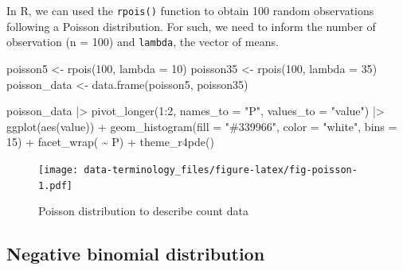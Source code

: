 \documentclass[
  letterpaper,
]{book}
\newenvironment{Shaded}{\begin{snugshade}}{\end{snugshade}}
\newcommand{\AttributeTok}[1]{\textcolor[rgb]{0.40,0.45,0.13}{#1}}
\newcommand{\DecValTok}[1]{\textcolor[rgb]{0.68,0.00,0.00}{#1}}
\newcommand{\FunctionTok}[1]{\textcolor[rgb]{0.28,0.35,0.67}{#1}}
\newcommand{\NormalTok}[1]{\textcolor[rgb]{0.00,0.23,0.31}{#1}}
\newcommand{\OtherTok}[1]{\textcolor[rgb]{0.00,0.23,0.31}{#1}}
\newcommand{\SpecialCharTok}[1]{\textcolor[rgb]{0.37,0.37,0.37}{#1}}
\newcommand{\StringTok}[1]{\textcolor[rgb]{0.13,0.47,0.30}{#1}}
\begin{document}
In R, we can used the \texttt{rpois()} function to obtain 100 random
observations following a Poisson distribution. For such, we need to
inform the number of observation (n = 100) and \texttt{lambda}, the
vector of means.

\begin{Shaded}
\begin{Highlighting}[]
\NormalTok{poisson5 }\OtherTok{\textless{}{-}} \FunctionTok{rpois}\NormalTok{(}\DecValTok{100}\NormalTok{, }\AttributeTok{lambda =} \DecValTok{10}\NormalTok{)}
\NormalTok{poisson35 }\OtherTok{\textless{}{-}} \FunctionTok{rpois}\NormalTok{(}\DecValTok{100}\NormalTok{, }\AttributeTok{lambda =} \DecValTok{35}\NormalTok{)}
\NormalTok{poisson\_data }\OtherTok{\textless{}{-}} \FunctionTok{data.frame}\NormalTok{(poisson5, poisson35)}
\end{Highlighting}
\end{Shaded}

\begin{Shaded}
\begin{Highlighting}[]
\NormalTok{poisson\_data }\SpecialCharTok{|\textgreater{}}
  \FunctionTok{pivot\_longer}\NormalTok{(}\DecValTok{1}\SpecialCharTok{:}\DecValTok{2}\NormalTok{, }\AttributeTok{names\_to =} \StringTok{"P"}\NormalTok{,}
               \AttributeTok{values\_to =} \StringTok{"value"}\NormalTok{) }\SpecialCharTok{|\textgreater{}}
  \FunctionTok{ggplot}\NormalTok{(}\FunctionTok{aes}\NormalTok{(value)) }\SpecialCharTok{+}
  \FunctionTok{geom\_histogram}\NormalTok{(}\AttributeTok{fill =} \StringTok{"\#339966"}\NormalTok{,}
                 \AttributeTok{color =} \StringTok{"white"}\NormalTok{,}
                 \AttributeTok{bins =} \DecValTok{15}\NormalTok{) }\SpecialCharTok{+}
  \FunctionTok{facet\_wrap}\NormalTok{( }\SpecialCharTok{\textasciitilde{}}\NormalTok{ P) }\SpecialCharTok{+}
  \FunctionTok{theme\_r4pde}\NormalTok{()}
\end{Highlighting}
\end{Shaded}

\begin{figure}

\texttt{[image: data-terminology\_files/figure-latex/fig-poisson-1.pdf]} \hfill{}

\caption{\label{fig-poisson}Poisson distribution to describe count data}

\end{figure}

\hypertarget{negative-binomial-distribution}{%
\subsection{Negative binomial
distribution}\label{negative-binomial-distribution}}
\end{document}

